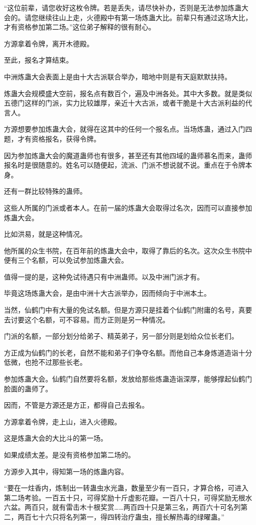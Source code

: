 \begin{this_body}
“这位前辈，请您收好这枚令牌。若是丢失，请尽快补办，否则是无法参加炼蛊大会的。请您继续往山上走，火德殿中有第一场炼蛊大比。前辈只有通过这场大比，才有资格参加第二场。”这位弟子解释的很有耐心。

方源拿着令牌，离开木德殿。

至此，报名才算结束。

中洲炼蛊大会表面上是由十大古派联合举办，暗地中则是有天庭默默扶持。

炼蛊大会规模盛大空前，报名点有数百个，遍及中洲各处。其中大多数。就是类似五德门这样的门派，实力比较雄厚，亲近十大古派，或者干脆是十大古派利益的代言人。

方源想要参加炼蛊大会，就得在这其中的任何一个报名点。当场炼蛊，通过入门四题，才有资格报名，获得令牌。

因为参加炼蛊大会的魔道蛊师也有很多，甚至还有其他四域的蛊师慕名而来，蛊师报名时是很随意的。姓名可以随便起，流派、门派不想说就不说。重点在于令牌本身。

还有一群比较特殊的蛊师。

这些人所属的门派或者本人。在前一届的炼蛊大会取得过名次，因而可以直接参加炼蛊大会。

比如洪易，就是这种情况。

他所属的众生书院，在百年前的炼蛊大会中，取得了靠后的名次。这次众生书院中便有三个名额，可以免试参加炼蛊大会。

值得一提的是，这种免试待遇只有中洲蛊师。以及中洲门派才有。

毕竟这场炼蛊大会，是由中洲十大古派举办，因而倾向于中洲本土。

当然，仙鹤门中有大量的免试名额。但是方源只是挂着个仙鹤门附庸的名号，真要去讨要这个名额，可不容易。而方正则是另一种情况。

门派的名额，一部分划分给弟子、精英弟子，另一部分则是划给众位长老们。

方正成为仙鹤门的长老，自然不能和弟子们争夺名额。而他自己本身炼道造诣十分低微，也抢不过那些长老。

参加炼蛊大会。仙鹤门自然要将名额，发放给那些炼蛊造诣深厚，能够撑起仙鹤门脸面的蛊师了。

因而，不管是方源还是方正，都得自己去报名。

方源拿着令牌，走上山，进入火德殿。

这是炼蛊大会的大比斗的第一场。

如果成绩太差。是没有资格参加第二场的。

方源步入其中，得知第一场的炼蛊内容。

“要在一炷香内，炼制出一转蛊虫水光蛊，数量至少有一百只，才算合格，可进入第二场考验。一百五十只，可得奖励十斤虚影花瓣。一百八十只，可得奖励无根水六盆。两百只，就有雷击木十根奖赏……两百四十只是第三名，两百六十可名列第二，两百七十六只将名列第一，得四转治疗蛊虫，擅长解热毒的绿曜蛊。”


\end{this_body}
